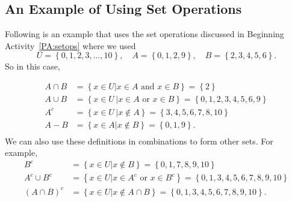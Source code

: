 \subsection*{An Example of Using Set Operations} \label{ss:example-sets}
Following is an example that uses the set operations discussed in Beginning Activity~\ref{PA:setops} where 
we used 
\[
  U = \left\{ {0,1,2,3, \ldots ,10} \right\}\!, \quad  A = \left\{ {0,1,2,9} \right\}\!, \quad  B = \left\{ {2,3,4,5,6} \right\}\!. 
\]
So in this case,

\[
\begin{aligned}
A \cap B &= \left\{ {x \in U \left| {x \in A\text{  and  }x \in B} \right.} \right\} = \left\{ 2 \right\} \\
A \cup B &= \left\{ {x \in U\,\left| {x \in A\text{  or  }x \in B} \right.} \right\} = \left\{ {0,1,2,3,4,5,6,9} \right\} \\
A^c  &= \left\{ {\left. {x \in U\,} \right|x \notin A} \right\} = \left\{ {3,4,5,6,7,8,10} \right\} \\
A - B &= \left\{ {\left. {x \in A} \right|x \notin B} \right\} = \left\{ {0,1,9} \right\}\!. \\
\end{aligned}
\]
We can also use these definitions in combinations to form other sets.  For example,
\[
\begin{aligned}
B^c  &= \left\{ {\left. {x \in U} \right|x \notin B} \right\} = \left\{ {0,1,7,8,9,10} \right\} \\
A^c  \cup  B^c  &= \left\{ {\left. {x \in U} \right|x \in A^c \text{  or  }x \in B^c } \right\} = \left\{ {0,1,3,4,5,6,7,8,9,10} \right\}  \\
\left( {A \cap B} \right)^c  &= \left\{ {x \in U\left.  \right|x \notin A \cap B} \right\} = \left\{ {0,1,3,4,5,6,7,8,9,10} \right\}\!. \\
\end{aligned}
\]
%
\hbreak
\endinput

